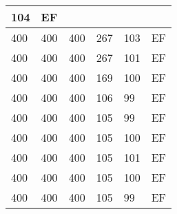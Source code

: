 \begin{table}[]
\begin{tabular}{lllll|l|}
104                                & EF                                    \\ \hline
400                                 & 400                                & 400                                & 267                                & 
103                                & EF                                    \\ \hline
400                                 & 400                                & 400                                & 267                                & 
101                                & EF                                    \\ \hline
400                                 & 400                                & 400                                & 169                                & 
100                                & EF                                    \\ \hline
400                                 & 400                                & 400                                & 106                                & 
99                                 & EF                                    \\ \hline
400                                 & 400                                & 400                                & 105                                & 
99                                 & EF                                    \\ \hline
400                                 & 400                                & 400                                & 105                                & 
100                                & EF                                    \\ \hline
400                                 & 400                                & 400                                & 105                                & 
101                                & EF                                    \\ \hline
400                                 & 400                                & 400                                & 105                                & 
100                                & EF                                    \\ \hline
400                                 & 400                                & 400                                & 105                                & 
99                                 & EF                                    \\ \hline

\end{tabular}
\end{table}
